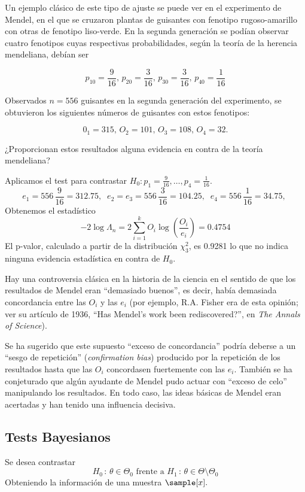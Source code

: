 \documentclass{apuntes}
\begin{document}
\begin{example} Un ejemplo clásico de este tipo de ajuste se puede ver en el experimento de Mendel, en el que se cruzaron plantas de guisantes con fenotipo rugoso-amarillo con otras de fenotipo liso-verde. En la segunda generación se podían observar cuatro fenotipos cuyas respectivas probabilidades, según la teoría de la herencia mendeliana, debían ser

\[ p_{10} = \frac{9}{16},\,p_{20}=\frac{3}{16},\,p_{30}=\frac{3}{16},\,p_{40}=\frac{1}{16} \]

Observados $n=556$ guisantes en la segunda generación del experimento, se obtuvieron los siguientes números de guisantes con estos fenotipos:

\[ 0_1=315,\,O_2=101,\,O_3=108,\,O_4=32. \]

¿Proporcionan estos resultados alguna evidencia en contra de la teoría mendeliana?

Aplicamos el test para contrastar $H_0: p_1=\frac{9}{16},\dotsc,p_4=\frac{1}{16}. $
\[
e_1 = 556 \, \frac{9}{16} = 312.75,\;\;
e_2 = e_3 = 556 \, \frac{3}{16} = 104.25,\;\;
e_4 = 556 \, \frac{1}{16} = 34.75,\;
\]
Obtenemos el estadístico
\[
-2\log{\Lambda_n} =
2 \sum\limits_{i=1}^{k} O_i\log{\left(\frac{O_i}{e_i}\right)} =
0.4754
\]
El p-valor, calculado a partir de la distribución $\chi^2_3$, es 0.9281 lo que no indica ninguna evidencia estadística en contra de $H_0$.

\pagebreak
Hay una controversia clásica en la historia de la ciencia en el sentido de que los resultados de Mendel eran ``demasiado buenos'',
es decir, había demasiada concordancia entre las $O_i$ y las $e_i$ (por ejemplo, R.A. Fisher era de esta opinión; ver su artículo de 1936,
``Has Mendel’s work been rediscovered?'', en \textit{The Annals of Science}).

Se ha sugerido que este supuesto ``exceso de concordancia'' podría deberse a un ``sesgo de repetición'' (\textit{confirmation bias}) producido por la repetición de los resultados hasta que las $O_i$ concordasen fuertemente con las $e_i$. También se ha conjeturado que algún ayudante de Mendel pudo actuar con ``exceso de celo'' manipulando los resultados. En todo caso, las ideas básicas de Mendel eran acertadas y han tenido una influencia decisiva.
\end{example}

\subsection{Tests Bayesianos}
Se desea contrastar
\[
H_0 \,:\, \theta \in \Theta_0 \text{ frente a } H_1 \,:\, \theta \in \Theta \setminus \Theta_0
\]
Obteniendo la información de una muestra $\sample[x].$
\end{document}
